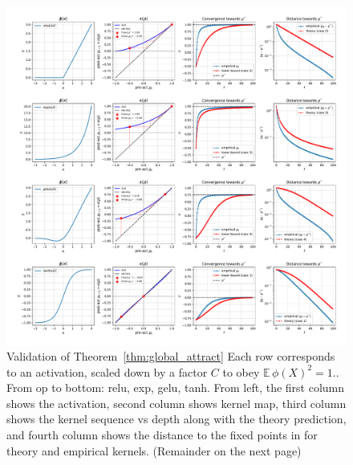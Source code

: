 \documentclass[twoside]{article}
\newcommand{\E}{\mathbb{E}\,}
\theoremstyle{definition}
\begin{document}




\begin{figure}[ht]
    \centering
    \includegraphics[width=\textwidth]{./kernel_convergence.pdf}
    \caption{\small Validation of Theorem~\ref{thm:global_attract} Each row corresponds to an activation, scaled down by a factor $C$ to obey $\E \phi(X)^2=1.$. From op to bottom: relu, exp, gelu, tanh. From left, the first column shows the activation, second column shows kernel map, third column shows the kernel sequence vs depth along with the theory prediction, and fourth column shows the distance to the fixed points in for theory and empirical kernels. (Remainder on the next page)}
    \label{fig:validation_plots}
\end{figure}
\end{document}
